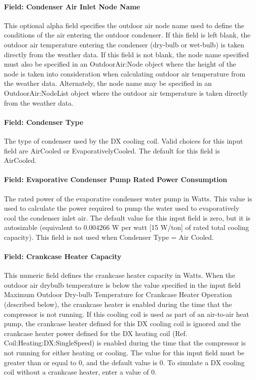\paragraph{Field: Condenser Air Inlet Node Name}\label{field-condenser-air-inlet-node-name-3}

This optional alpha field specifies the outdoor air node name used to define the conditions of the air entering the outdoor condenser. If this field is left blank, the outdoor air temperature entering the condenser (dry-bulb or wet-bulb) is taken directly from the weather data. If this field is not blank, the node name specified must also be specified in an OutdoorAir:Node object where the height of the node is taken into consideration when calculating outdoor air temperature from the weather data. Alternately, the node name may be specified in an OutdoorAir:NodeList object where the outdoor air temperature is taken directly from the weather data.

\paragraph{Field: Condenser Type}\label{field-condenser-type-3}

The type of condenser used by the DX cooling coil. Valid choices for this input field are AirCooled or EvaporativelyCooled. The default for this field is AirCooled.

\paragraph{Field: Evaporative Condenser Pump Rated Power Consumption}\label{field-evaporative-condenser-pump-rated-power-consumption-1}

The rated power of the evaporative condenser water pump in Watts. This value is used to calculate the power required to pump the water used to evaporatively cool the condenser inlet air. The default value for this input field is zero, but it is autosizable (equivalent to 0.004266 W per watt {[}15 W/ton{]} of rated total cooling capacity). This field is not used when Condenser Type = Air Cooled.

\paragraph{Field: Crankcase Heater Capacity}\label{field-crankcase-heater-capacity-3}

This numeric field defines the crankcase heater capacity in Watts. When the outdoor air drybulb temperature is below the value specified in the input field Maximum Outdoor Dry-bulb Temperature for Crankcase Heater Operation (described below), the crankcase heater is enabled during the time that the compressor is not running. If this cooling coil is used as part of an air-to-air heat pump, the crankcase heater defined for this DX cooling coil is ignored and the crankcase heater power defined for the DX heating coil (Ref. Coil:Heating:DX:SingleSpeed) is enabled during the time that the compressor is not running for either heating or cooling. The value for this input field must be greater than or equal to 0, and the default value is 0. To simulate a DX cooling coil without a crankcase heater, enter a value of 0.

